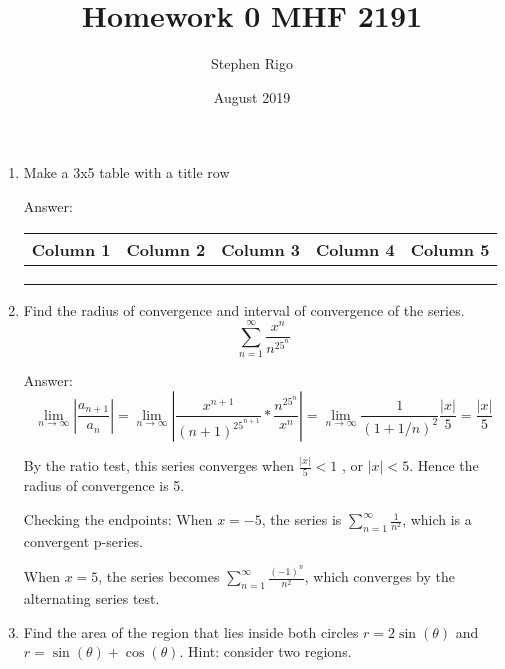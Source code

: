 \documentclass{article}
\title{Homework 0 MHF 2191}
\author{Stephen Rigo }
\date{August 2019}
\begin{document}
\maketitle

\begin{enumerate}
    \item 
Make a 3x5 table with a title row

Answer:
    \begin{table}[htbp]
        \centering
        \begin{tabular}{|c|c|c|c|c|}
        \hline
             Column 1 & Column 2 & Column 3 & Column 4 & Column 5\\
        \hline
                      &          &          &          &         \\
        \hline
                      &          &          &          &         \\
        \hline
                      &          &          &          &         \\
        \hline
        
        \end{tabular}
        \label{tab:my_label}
    \end{table}



    
\item
Find the radius of convergence and interval of convergence of the series.
    \begin{equation}
        \sum_{n=1}^{\infty} \frac{x^n}{n^25^n}
        \end{equation}
        
        Answer:
        $$ \lim_{n\to\infty} |\frac{a_{n+1}}{a_{n}}| = \lim_{n\to\infty} |\frac{x^{n+1}}{(n+1)^25^{n+1}}*\frac{n^25^n}{x^n}| = \lim_{n\to\infty} \frac{1}{(1+1/n)^2}\frac{|x|}{5} = \frac{|x|}{5}  $$
        
        By the ratio test, this series converges when $ \frac{|x|}{5}<1 $ , or $|x|<5$. Hence the radius of convergence is 5. 
        
        Checking the endpoints: When $x=-5$, the series is $\sum_{n=1}^{\infty} \frac{1}{n^2}$, which is a convergent p-series. 
        
        When $x=5$, the series becomes $\sum_{n=1}^{\infty} \frac{(-1)^n}{n^2}$, which converges by the alternating series test.
        



\item
Find the area of the region that lies inside both circles $r=2\sin(\theta)$ and $r=\sin(\theta)+\cos(\theta)$. Hint: consider two regions.


\end{enumerate}
\end{document}
